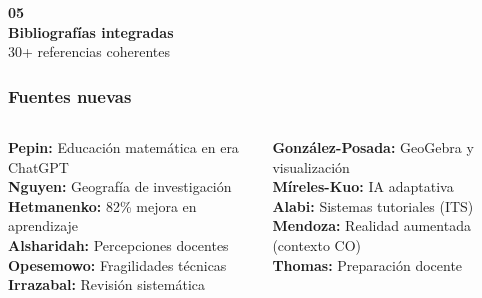 \documentclass[11pt, aspectratio=169, spanish]{beamer}
\begin{document}
\begin{frame}[plain]
\vspace*{1.0cm}
\begin{center}
{\fontsize{40}{48}\selectfont\textcolor{VerdeUNAL!40}{\textbf{05}}}\\[-0.1cm]
{\Large\textbf{Bibliografías integradas}}\\[0.05cm]
{\normalsize\textcolor{GrisClaro!80!black}{30+ referencias coherentes}}
\end{center}
\end{frame}

\begin{frame}[plain, shrink=20]
\frametitle{\faBook\quad Fuentes nuevas}
\vspace{0.05cm}

\begin{columns}[T]

\begin{tcolorbox}[colback=AzulInfo!7, colframe=AzulInfo!50, arc=2mm,
  title={\centering\scriptsize\textbf{1.2.1 Educación}}]
{\tiny
\textbf{Pepin:} Educación matemática en era ChatGPT\\
\textbf{Nguyen:} Geografía de investigación\\
\textbf{Hetmanenko:} 82\% mejora en aprendizaje\\
\textbf{Alsharidah:} Percepciones docentes\\
\textbf{Opesemowo:} Fragilidades técnicas\\
\textbf{Irrazabal:} Revisión sistemática
}
\end{tcolorbox}


\begin{tcolorbox}[colback=MoradoMarco!7, colframe=MoradoMarco!50, arc=2mm,
  title={\centering\scriptsize\textbf{1.2.2 Trigonometría}}]
{\tiny
\textbf{González-Posada:} GeoGebra y visualización\\
\textbf{Míreles-Kuo:} IA adaptativa\\
\textbf{Alabi:} Sistemas tutoriales (ITS)\\
\textbf{Mendoza:} Realidad aumentada (contexto CO)\\
\textbf{Thomas:} Preparación docente
}
\end{tcolorbox}



\end{columns}
\end{frame}
\end{document}
